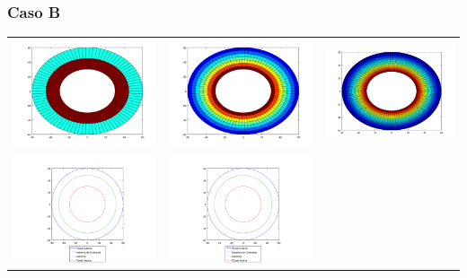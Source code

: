       \subsubsection*{Caso B}
        
          {\centering \begin{tabular}{ccc}
            \includegraphics[width=4.5cm]{graficos/exp4/const/exp4-const-rad-3.png} &
            \includegraphics[width=4.5cm]{graficos/exp4/const/exp4-const-rad-8.png} &
            \includegraphics[width=4.5cm]{graficos/exp4/const/exp4-const-rad-30.png} \\
            \includegraphics[width=5cm]{graficos/exp4/const/exp4-const-rad-3-iso.png} &
            \includegraphics[width=5cm]{graficos/exp4/const/exp4-const-rad-8-iso.png} &

\end{tabular}}
